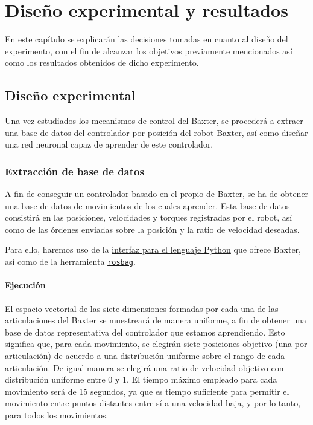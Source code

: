 \chapter{Diseño experimental y resultados}
En este capítulo se explicarán las decisiones tomadas en cuanto al diseño del experimento, con el fin de alcanzar los objetivos previamente mencionados así como los resultados obtenidos de dicho experimento.
\section{Diseño experimental}
Una vez estudiados los \hyperref[subsec:metodos/control_baxter]{mecanismos de control del Baxter}, se procederá a extraer una base de datos del controlador por posición del robot Baxter, así como diseñar una red neuronal capaz de aprender de este controlador.

\subsection{Extracción de base de datos}
A fin de conseguir un controlador basado en el propio de Baxter, se ha de obtener una base de datos de movimientos de los cuales aprender. Esta base de datos consistirá en las posiciones, velocidades y torques registradas por el robot, así como de las órdenes enviadas sobre la posición y la ratio de velocidad deseadas.

Para ello, haremos uso de la \hyperref[subsubsec:metodos/pythonAPI]{interfaz para el lenguaje Python} que ofrece Baxter, así como de la herramienta \hyperref[subsec:metodos/rosbag]{\texttt{rosbag}}.
\subsubsection{Ejecución}
El espacio vectorial de las siete dimensiones formadas por cada una de las articulaciones del Baxter se muestreará de manera uniforme, a fin de obtener una base de datos representativa del controlador que estamos aprendiendo. Esto significa que, para cada movimiento, se elegirán siete posiciones objetivo (una por articulación) de acuerdo a una distribución uniforme sobre el rango de cada articulación. De igual manera se elegirá una ratio de velocidad objetivo con distribución uniforme entre 0 y 1. El tiempo máximo empleado para cada movimiento será de 15 segundos, ya que es tiempo suficiente para permitir el movimiento entre puntos distantes entre sí a una velocidad baja, y por lo tanto, para todos los movimientos.

